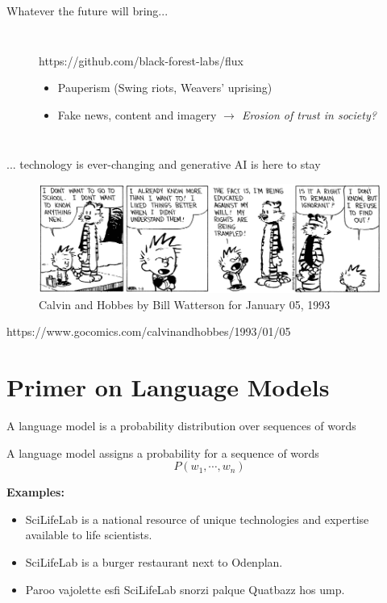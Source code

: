 \documentclass[10pt]{beamer}
\newcommand{\credit}[1]{{\par \raggedleft \scriptsize \mdseries \color{mDarkBrown} #1 \par}}
\newcommand{\creditdark}[1]{{\par \raggedleft \scriptsize \mdseries \color{scMGray} #1 \par}}
\begin{document}
\begin{frame}[standout]{Whatever the future will bring...}
\begin{columns}[T,onlytextwidth]
\begin{figure}
			\creditdark{https://github.com/black-forest-labs/flux}
				\begin{itemize}
				\item Pauperism (Swing riots, Weavers' uprising)
				\item Fake news, content and imagery\vspace{0.5cm} \linebreak 
						\emph{$\rightarrow$ Erosion of trust in society?}
			\end{itemize}
		\end{figure}
	\end{columns}
\end{frame}


\begin{frame}{... technology is ever-changing and generative AI is here to stay}
\begin{figure}
	\includegraphics[width=\textwidth]{figures/IgnorantCalvin.jpg}
	\caption{Calvin and Hobbes by Bill Watterson for January 05, 1993}
\end{figure}
\credit{https://www.gocomics.com/calvinandhobbes/1993/01/05}
\end{frame}


\section{Primer on Language Models}



\begin{frame}{A language model is a probability distribution over sequences of words}
		\begin{exampleblock}{A language model}
			assigns a probability for a sequence of words
			$$
			P(w_1, \cdots, w_{n})
			$$
		\end{exampleblock}
		\textbf{Examples:}
			\begin{itemize}
				\item SciLifeLab is a national resource of unique technologies and expertise available to life scientists.
				\item SciLifeLab is a burger restaurant next to Odenplan.
				\item Paroo vajolette esfi SciLifeLab snorzi palque Quatbazz hos ump.
			\end{itemize}
\end{frame}
\end{document}
